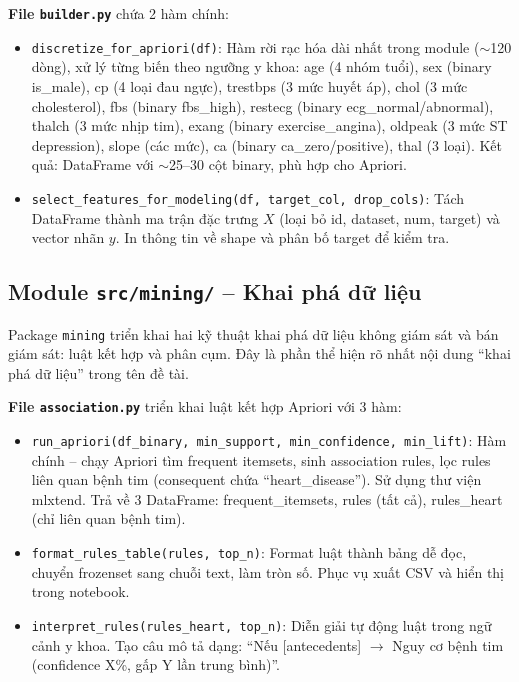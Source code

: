 \textbf{File \texttt{builder.py}} chứa 2 hàm chính:

\begin{itemize}
    \item \texttt{discretize\_for\_apriori(df)}: Hàm rời rạc hóa dài nhất trong module ($\sim$120 dòng), xử lý từng biến theo ngưỡng y khoa: age (4 nhóm tuổi), sex (binary is\_male), cp (4 loại đau ngực), trestbps (3 mức huyết áp), chol (3 mức cholesterol), fbs (binary fbs\_high), restecg (binary ecg\_normal/abnormal), thalch (3 mức nhịp tim), exang (binary exercise\_angina), oldpeak (3 mức ST depression), slope (các mức), ca (binary ca\_zero/positive), thal (3 loại). Kết quả: DataFrame với $\sim$25--30 cột binary, phù hợp cho Apriori.
    \item \texttt{select\_features\_for\_modeling(df, target\_col, drop\_cols)}: Tách DataFrame thành ma trận đặc trưng $X$ (loại bỏ id, dataset, num, target) và vector nhãn $y$. In thông tin về shape và phân bố target để kiểm tra.
\end{itemize}

\subsection{Module \texttt{src/mining/} -- Khai phá dữ liệu}

Package \texttt{mining} triển khai hai kỹ thuật khai phá dữ liệu không giám sát và bán giám sát: luật kết hợp và phân cụm. Đây là phần thể hiện rõ nhất nội dung ``khai phá dữ liệu'' trong tên đề tài.

\textbf{File \texttt{association.py}} triển khai luật kết hợp Apriori với 3 hàm:
\begin{itemize}
    \item \texttt{run\_apriori(df\_binary, min\_support, min\_confidence, min\_lift)}: Hàm chính -- chạy Apriori tìm frequent itemsets, sinh association rules, lọc rules liên quan bệnh tim (consequent chứa ``heart\_disease''). Sử dụng thư viện mlxtend. Trả về 3 DataFrame: frequent\_itemsets, rules (tất cả), rules\_heart (chỉ liên quan bệnh tim).
    \item \texttt{format\_rules\_table(rules, top\_n)}: Format luật thành bảng dễ đọc, chuyển frozenset sang chuỗi text, làm tròn số. Phục vụ xuất CSV và hiển thị trong notebook.
    \item \texttt{interpret\_rules(rules\_heart, top\_n)}: Diễn giải tự động luật trong ngữ cảnh y khoa. Tạo câu mô tả dạng: ``Nếu [antecedents] $\rightarrow$ Nguy cơ bệnh tim (confidence X\%, gấp Y lần trung bình)''.
\end{itemize}

